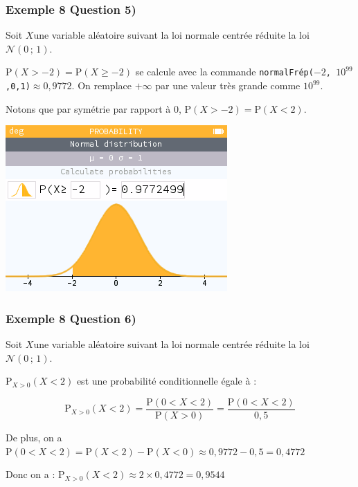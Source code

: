 \documentclass[xcolor=svgnames,t,final]{beamer}
\begin{document}
\begin{frame}
\frametitle{Exemple 8 Question 5)}


Soit  $X $une variable aléatoire suivant la loi normale centrée réduite la loi $\mathcal{N}\left(0 \, ; \, 1\right)$.




 $\text{P}\left(  X  > -2  \right)=\text{P}\left(  X  \geqslant -2  \right)$  se calcule avec la commande \texttt{normalFrép($-2$, $10^{99}$,0,1)}$\approx  0,9772$. On remplace $+\infty$ par une valeur très grande comme $10^{99}$.
 
Notons que par symétrie par rapport à $0$, $\text{P}\left(  X  > -2  \right)= \text{P}\left(  X  < 2 \right)  $.


\begin{center}
\includegraphics[scale=0.3]{images/exemple8-fig5.png}
\end{center}

\end{frame}

\begin{frame}
\frametitle{Exemple 8 Question 6)}


Soit  $X $une variable aléatoire suivant la loi normale centrée réduite la loi $\mathcal{N}\left(0 \, ; \, 1\right)$.


$\text{P}_{X>0} \left( X <2\right)$ est une probabilité conditionnelle égale à :

\begin{equation*}
\text{P}_{X>0} \left( X <2\right)=\frac{\text{P}\left(0 <  X <2\right)}{\text{P}\left( X >0\right)}=\frac{\text{P}\left(0< X <2\right)}{0,5}
\end{equation*}

De plus, on a $\text{P}\left(0< X <2\right)=\text{P}\left( X <2\right)-\text{P}\left( X <0\right)\approx 0,9772 - 0,5 = 0,4772$

Donc on a : $\text{P}_{X>0} \left( X <2\right)\approx 2 \times 0,4772 = 0,9544$

\end{frame}
\end{document}

